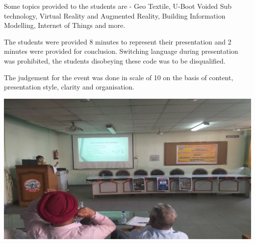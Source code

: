 \documentclass[12pt, a4 paper]{article}
\begin{document}
\begin{center}
\begin{large}
\begin{multicols}{2}
\columnbreak
\large Some topics provided to the students are - Geo Textile, U-Boot Voided Sub technology, Virtual Reality and Augmented Reality, Building Information Modelling, Internet of Things and more.
  
\end{multicols} 
\bigskip
The students were provided 8 minutes to represent their presentation and 2 minutes were provided for conclusion. Switching language during presentation was prohibited, the students disobeying these code was to be disqualified.
\bigskip
\begin{multicols}{2}
The judgement for the event was done in scale of 10 on the basis of content, presentation style, clarity and organisation.  

\columnbreak
\includegraphics[width=\linewidth]{image8.jpeg}

\end{multicols} 

\end{large} 
\end{center}

\newpage 
\end{document}
